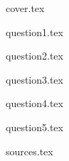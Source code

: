 \documentclass{article}
\begin{document}
{cover.tex}

\tableofcontents
\newpage

{question1.tex}

{question2.tex}

{question3.tex}

{question4.tex}

{question5.tex}

{sources.tex}
\end{document}
